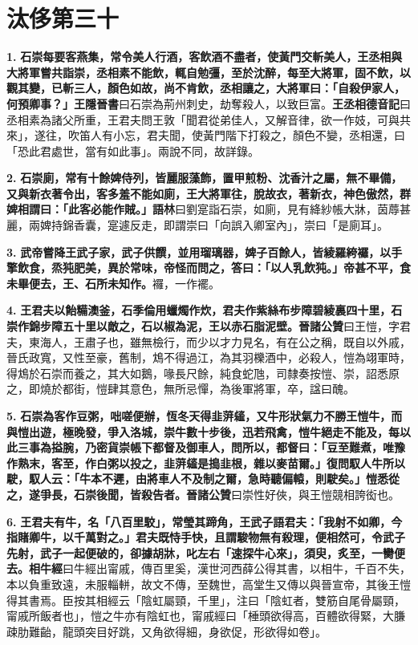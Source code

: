 \chapter{汰侈第三十}

\textbf{1.} \textbf{石崇每要客燕集，常令美人行酒，客飲酒不盡者，使黃門交斬美人，王丞相與大將軍嘗共詣崇，丞相素不能飲，輒自勉彊，至於沈醉，每至大將軍，固不飲，以觀其變，已斬三人，顏色如故，尚不肯飲，丞相讓之，大將軍曰：「自殺伊家人，何預卿事？」}{\footnotesize \textbf{王隱晉書}曰石崇為荊州刺史，劫奪殺人，以致巨富。\textbf{王丞相德音記}曰丞相素為諸父所重，王君夫問王敦「聞君從弟佳人，又解音律，欲一作妓，可與共來」，遂往，吹笛人有小忘，君夫聞，使黃門階下打殺之，顏色不變，丞相還，曰「恐此君處世，當有如此事」。兩說不同，故詳錄。}

\textbf{2.} \textbf{石崇廁，常有十餘婢侍列，皆麗服藻飾，置甲煎粉、沈香汁之屬，無不畢備，又與新衣著令出，客多羞不能如廁，王大將軍往，脫故衣，著新衣，神色傲然，群婢相謂曰：「此客必能作賊。」}{\footnotesize \textbf{語林}曰劉寔詣石崇，如廁，見有絳紗帳大牀，茵蓐甚麗，兩婢持錦香囊，寔遽反走，即謂崇曰「向誤入卿室內」，崇曰「是廁耳」。}

\textbf{3.} \textbf{武帝嘗降王武子家，武子供饌，並用瑠璃器，婢子百餘人，皆綾羅絝𧟌，以手擎飲食，烝㹠肥美，異於常味，帝怪而問之，答曰：「以人乳飲㹠。」帝甚不平，食未畢便去，王、石所未知作。}{\footnotesize 𧟌，一作襬。}

\textbf{4.} \textbf{王君夫以飴糒澳釜，石季倫用蠟燭作炊，君夫作紫絲布步障碧綾裏四十里，石崇作錦步障五十里以敵之，石以椒為泥，王以赤石脂泥壁。}{\footnotesize \textbf{晉諸公贊}曰王愷，字君夫，東海人，王肅子也，雖無檢行，而少以才力見名，有在公之稱，既自以外戚，晉氏政寬，又性至豪，舊制，鴆不得過江，為其羽櫟酒中，必殺人，愷為翊軍時，得鴆於石崇而養之，其大如鵝，喙長尺餘，純食蛇虺，司隸奏按愷、崇，詔悉原之，即燒於都街，愷肆其意色，無所忌憚，為後軍將軍，卒，諡曰醜。}

\textbf{5.} \textbf{石崇為客作豆粥，咄嗟便辦，恆冬天得韭蓱䪢，又牛形狀氣力不勝王愷牛，而與愷出遊，極晚發，爭入洛城，崇牛數十步後，迅若飛禽，愷牛絕走不能及，每以此三事為搤腕，乃密貨崇帳下都督及御車人，問所以，都督曰：「豆至難煮，唯豫作熟末，客至，作白粥以投之，韭蓱䪢是搗韭根，雜以麥苗爾。」復問馭人牛所以駛，馭人云：「牛本不遲，由將車人不及制之爾，急時聽偏轅，則駛矣。」愷悉從之，遂爭長，石崇後聞，皆殺告者。}{\footnotesize \textbf{晉諸公贊}曰崇性好俠，與王愷競相誇衒也。}

\textbf{6.} \textbf{王君夫有牛，名「八百里駮」，常瑩其蹄角，王武子語君夫：「我射不如卿，今指賭卿牛，以千萬對之。」君夫既恃手快，且謂駿物無有殺理，便相然可，令武子先射，武子一起便破的，卻據胡牀，叱左右「速探牛心來」，須臾，炙至，一臠便去。}{\footnotesize \textbf{相牛經}曰牛經出甯戚，傳百里奚，漢世河西薛公得其書，以相牛，千百不失，本以負重致遠，未服輜軿，故文不傳，至魏世，高堂生又傳以與晉宣帝，其後王愷得其書焉。臣按其相經云「陰虹屬頸，千里」，注曰「陰虹者，雙筋自尾骨屬頸，甯戚所飯者也」，愷之牛亦有陰虹也，甯戚經曰「棰頭欲得高，百體欲得緊，大膁疎肋難齝，龍頭突目好跳，又角欲得細，身欲促，形欲得如卷」。}

